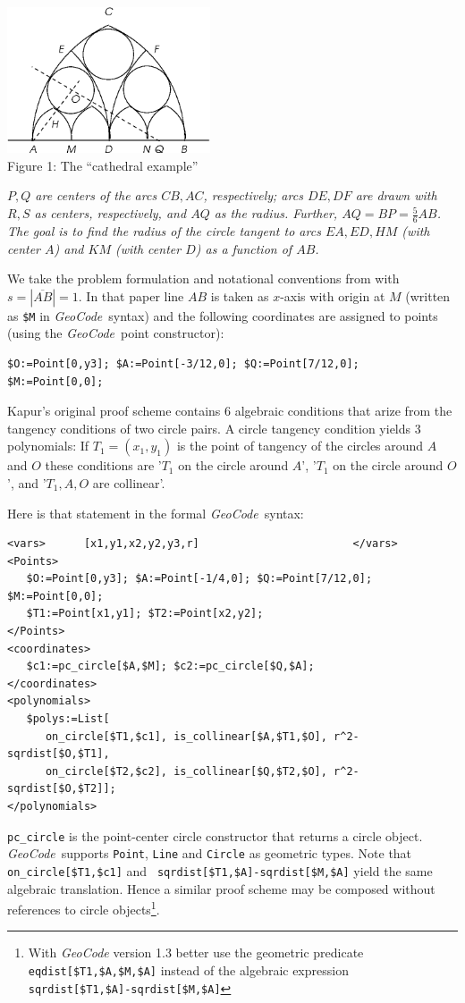 \documentclass[11pt]{article}
\newcommand{\GC}{\textit{Geo\-Code}}
\begin{document}
\parbox[b]{7cm}{\centering\includegraphics[width=6cm]{linz-02/gothic.eps}\\
Figure 1: The ``cathedral example''\vskip10pt}\hfill 
\parbox[b]{8cm}{\it $P, Q$ are centers of the arcs $CB, AC$, respectively;
  arcs $DE, DF$ are drawn with $R, S$ as centers, respectively, and $AQ$ as
  the radius. Further, $AQ=BP=\frac56 AB$.  The goal is to find the radius of
  the circle tangent to arcs $EA,ED,HM$ (with center $A$) and $KM$ (with
  center $D$) as a function of $AB$.\vskip40pt}

We take the problem formulation and notational conventions from
\cite{Kapur_97a} with $s=|\overline{AB}|=1$.  In that paper line $AB$ is taken
as $x$-axis with origin at $M$ (written as {\tt \$M} in \GC\ syntax) and the
following coordinates are assigned to points (using the \GC\ point
constructor):
\begin{verbatim}
$O:=Point[0,y3]; $A:=Point[-3/12,0]; $Q:=Point[7/12,0]; $M:=Point[0,0];
\end{verbatim}
Kapur's original proof scheme contains 6 algebraic conditions that arize from
the tangency conditions of two circle pairs.  A circle tangency condition
yields 3 polynomials: If $T_1=(x_1,y_1)$ is the point of tangency of the
circles around $A$ and $O$ these conditions are '$T_1$ on the circle around
$A$', '$T_1$ on the circle around $O$', and '$T_1, A, O$ are collinear'.

Here is that statement in the formal \GC\ syntax:
\begin{verbatim}
<vars>      [x1,y1,x2,y2,y3,r]                        </vars>
<Points>
   $O:=Point[0,y3]; $A:=Point[-1/4,0]; $Q:=Point[7/12,0]; $M:=Point[0,0]; 
   $T1:=Point[x1,y1]; $T2:=Point[x2,y2]; 
</Points>
<coordinates> 
   $c1:=pc_circle[$A,$M]; $c2:=pc_circle[$Q,$A];
</coordinates>
<polynomials>
   $polys:=List[
      on_circle[$T1,$c1], is_collinear[$A,$T1,$O], r^2-sqrdist[$O,$T1], 
      on_circle[$T2,$c2], is_collinear[$Q,$T2,$O], r^2-sqrdist[$O,$T2]];
</polynomials>
\end{verbatim}%
{\tt pc\_circle} is the point-center circle constructor that returns a circle
object.  \GC\ supports {\tt Point}, {\tt Line} and {\tt Circle} as geometric
types. Note that {\tt on\_circle[\$T1,\$c1]} and {\tt
  sqrdist[\$T1,\$A]-sqrdist[\$M,\$A]} yield the same algebraic translation.
Hence a similar proof scheme may be composed without references to circle
objects\footnote{With {\GC} version 1.3 better use the geometric predicate
  {\tt eqdist[\$T1,\$A,\$M,\$A]} instead of the algebraic expression {\tt
    sqrdist[\$T1,\$A]-sqrdist[\$M,\$A]}}.
\end{document}
